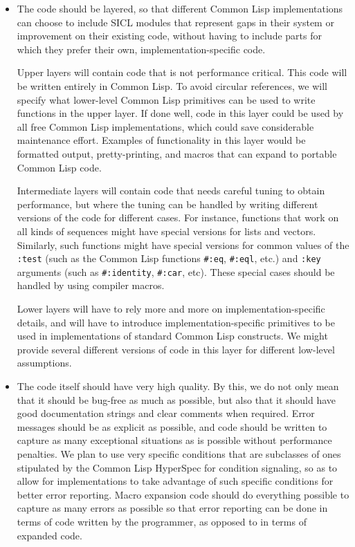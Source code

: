 \documentclass{article}
\def\sysname{SICL}
\begin{document}
\begin{itemize}
\item The code should be layered, so that different Common Lisp
  implementations can choose to include \sysname{} modules that
  represent gaps in their system or improvement on their existing
  code, without having to include parts for which they prefer their
  own, implementation-specific code. 

  Upper layers will contain code that is not performance critical.
  This code will be written entirely in Common Lisp.  To avoid
  circular references, we will specify what lower-level Common Lisp
  primitives can be used to write functions in the upper layer.  If
  done well, code in this layer could be used by all free Common Lisp
  implementations, which could save considerable maintenance effort.
  Examples of functionality in this layer would be formatted output,
  pretty-printing, and macros that can expand to portable Common Lisp
  code.

  Intermediate layers will contain code that needs careful tuning to
  obtain performance, but where the tuning can be handled by writing
  different versions of the code for different cases.  For instance,
  functions that work on all kinds of sequences might have special
  versions for lists and vectors.  Similarly, such functions might
  have special versions for common values of the \texttt{:test} (such
  as the Common Lisp functions \texttt{\#:eq}, \texttt{\#:eql}, etc.)
  and \texttt{:key} arguments (such as \texttt{\#:identity},
  \texttt{\#:car}, etc).  These special cases should be handled by
  using compiler macros.

  Lower layers will have to rely more and more on
  implementation-specific details, and will have to introduce
  implementation-specific primitives to be used in implementations of
  standard Common Lisp constructs.  We might provide several different
  versions of code in this layer for different low-level assumptions.

\item The code itself should have very high quality.  By this, we do
  not only mean that it should be bug-free as much as possible, but
  also that it should have good documentation strings and clear
  comments when required.  Error messages should be as explicit as
  possible, and code should be written to capture as many exceptional
  situations as is possible without performance penalties.  We plan to
  use very specific conditions that are subclasses of ones stipulated
  by the Common Lisp HyperSpec for condition signaling, so as to allow
  for implementations to take advantage of such specific conditions
  for better error reporting.  Macro expansion code should do
  everything possible to capture as many errors as possible so that
  error reporting can be done in terms of code written by the
  programmer, as opposed to in terms of expanded code.

\end{itemize}
\end{document}
